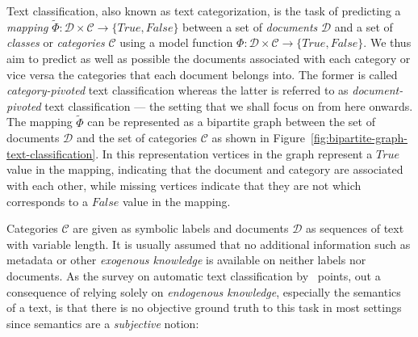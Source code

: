 Text classification, also known as text categorization, is the task of predicting a \emph{mapping} $\widetilde{\Phi} : \mathcal{D} \times \mathcal{C} \rightarrow \{True, False\}$ between a set of \emph{documents} $\mathcal{D}$ and a set of \emph{classes} or \emph{categories} $\mathcal{C}$ using a model function $\Phi : \mathcal{D} \times \mathcal{C} \rightarrow \{True, False \}$.
We thus aim to predict as well as possible the documents associated with each category or vice versa the categories that each document belongs into. The former is called \emph{category-pivoted} text classification whereas the latter is referred to as \emph{document-pivoted} text classification --- the setting that we shall focus on from here onwards.
The mapping $\widetilde{\Phi}$ can be represented as a bipartite graph between the set of documents $\mathcal{D}$ and the set of categories $\mathcal{C}$ as shown in Figure~\ref{fig:bipartite-graph-text-classification}. In this representation vertices in the graph represent a $True$ value in the mapping, indicating that the document and category are associated with each other, while missing vertices indicate that they are not which corresponds to a $False$ value in the mapping.

Categories $\mathcal{C}$ are given as symbolic labels and documents $\mathcal{D}$ as sequences of text with variable length. It is usually assumed that no additional information such as metadata or other \emph{exogenous knowledge} is available on neither labels nor documents.
As the survey on automatic text classification by~\cite{Sebastiani:2002aa} points, out a consequence of relying solely on \emph{endogenous knowledge}, especially the semantics of a text, is that there is no objective ground truth to this task in most settings since semantics are a \emph{subjective} notion: 

